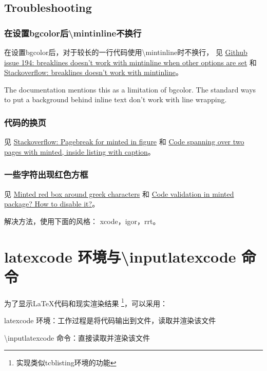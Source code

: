 \subsection{Troubleshooting}

\subsubsection{在设置{\ttfamily bgcolor}后{\ttfamily \textbackslash mintinline}不换行}

在设置{\ttfamily bgcolor}后，对于较长的一行代码使用{\ttfamily \textbackslash mintinline}时不换行，
见
\href{https://github.com/gpoore/minted/issues/194}{Github issue 194: breaklines doesn't work with mintinline when other options are set}
和 
\href{https://tex.stackexchange.com/questions/419934/breaklines-doesnt-work-with-mintinline}{Stackoverflow: breaklines doesn't work with mintinline}。

The documentation mentions this as a limitation of bgcolor. The standard ways to put a background behind inline text don't work with line wrapping.

\subsubsection{代码的换页}

见
\href{https://tex.stackexchange.com/questions/368864/pagebreak-for-minted-in-figure}{Stackoverflow: Pagebreak for minted in figure}
和
\href{https://tex.stackexchange.com/questions/12428/code-spanning-over-two-pages-with-minted-inside-listing-with-caption/53540#53540}{Code spanning over two pages with minted, inside listing with caption}。

\subsubsection{一些字符出现红色方框}

见
\href{https://tex.stackexchange.com/questions/343494/minted-red-box-around-greek-characters}{Minted red box around greek characters}
和 
\href{https://tex.stackexchange.com/questions/424421/code-validation-in-minted-package-how-to-disable-it}{Code validation in minted package? How to disable it?}。

解决方法，使用下面的风格：
xcode，igor，rrt。

\section{{\ttfamily latexcode} 环境与{\ttfamily \textbackslash inputlatexcode} 命令}
为了显示{\LaTeX}代码和现实渲染结果
\footnote{实现类似{\ttfamily tcblisting}环境的功能}，可以采用：
\begin{compactitems}
  \item {\ttfamily latexcode} 环境：工作过程是将代码输出到文件，读取并渲染该文件
  \item {\ttfamily \textbackslash inputlatexcode} 命令：直接读取并渲染该文件
\end{compactitems}

